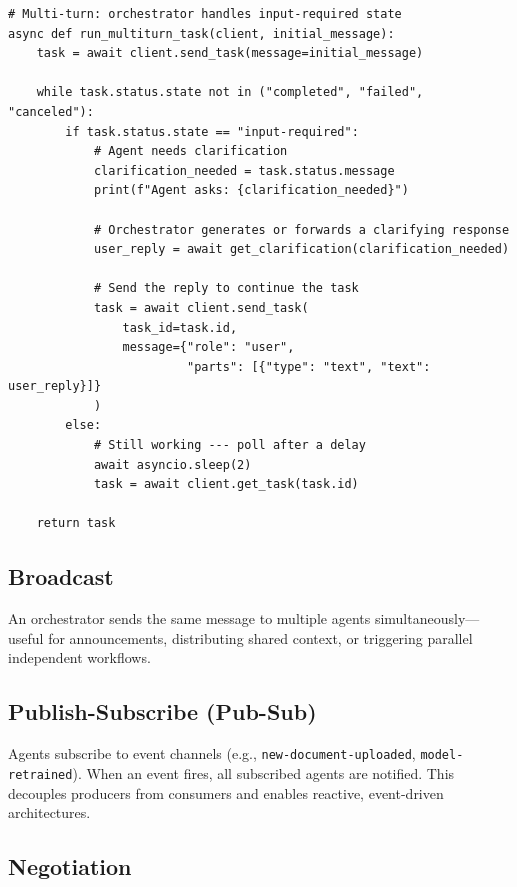 \begin{lstlisting}[style=pythonstyle]
# Multi-turn: orchestrator handles input-required state
async def run_multiturn_task(client, initial_message):
    task = await client.send_task(message=initial_message)

    while task.status.state not in ("completed", "failed", "canceled"):
        if task.status.state == "input-required":
            # Agent needs clarification
            clarification_needed = task.status.message
            print(f"Agent asks: {clarification_needed}")

            # Orchestrator generates or forwards a clarifying response
            user_reply = await get_clarification(clarification_needed)

            # Send the reply to continue the task
            task = await client.send_task(
                task_id=task.id,
                message={"role": "user",
                         "parts": [{"type": "text", "text": user_reply}]}
            )
        else:
            # Still working --- poll after a delay
            await asyncio.sleep(2)
            task = await client.get_task(task.id)

    return task
\end{lstlisting}

\subsection{Broadcast}
\label{broadcast}

An orchestrator sends the same message to multiple agents simultaneously---useful for announcements, distributing shared context, or triggering parallel independent workflows.

\subsection{Publish-Subscribe (Pub-Sub)}
\label{publish-subscribe-pub-sub}

Agents subscribe to event channels (e.g., \texttt{new-document-uploaded}, \texttt{model-retrained}). When an event fires, all subscribed agents are notified. This decouples producers from consumers and enables reactive, event-driven architectures.

\subsection{Negotiation}
\label{negotiation}

